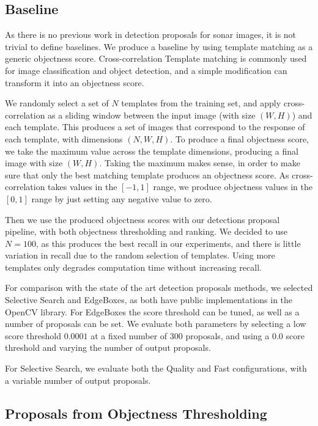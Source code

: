 \subsection{Baseline}

As there is no previous work in detection proposals for sonar images, it is not trivial to define baselines. We produce a baseline by using template matching as a generic objectness score. Cross-correlation Template matching  is commonly used for image classification and object detection, and a simple modification can transform it into an objectness score.

We randomly select a set of $N$ templates from the training set, and apply cross-correlation as a sliding window between the input image (with size $(W, H)$) and each template. This produces a set of images that correspond to the response of each template, with dimensions $(N, W, H)$. To produce a final objectness score, we take the maximum value across the template dimensions, producing a final image with size $(W, H)$. Taking the maximum makes sense, in order to make sure that only the best matching template produces an objectness score. As cross-correlation takes values in the $[-1, 1]$ range, we produce objectness values in the $[0, 1]$ range by just setting any negative value to zero.

Then we use the produced objectness scores with our detections proposal pipeline, with both objectness thresholding and ranking. We decided to use $N = 100$, as this produces the best recall in our experiments, and there is little variation in recall due to the random selection of templates. Using more templates only degrades computation time without increasing recall.

For comparison with the state of the art detection proposals methods, we selected Selective Search and EdgeBoxes, as both have public implementations in the OpenCV library. For EdgeBoxes the score threshold can be tuned, as well as a number of proposals can be set. We evaluate both parameters by selecting a low score threshold $0.0001$ at a fixed number of 300 proposals, and using a $0.0$ score threshold and varying the number of output proposals.

For Selective Search, we evaluate both the Quality and Fast configurations, with a variable number of output proposals.

\subsection{Proposals from Objectness Thresholding}

